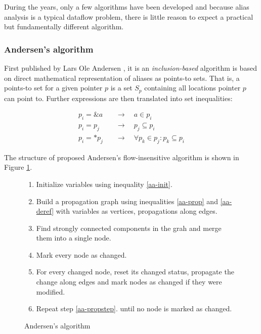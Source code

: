 During the years, only a few algorithms have been developed and because alias
analysis is a typical dataflow problem, there is little reason to expect a
practical but fundamentally different algorithm.

\subsubsection{Andersen's algorithm}

First published by Lars Ole Andersen \cite{Andersen94}, it is an {\it
inclusion-based} algorithm is based on direct mathematical representation of
aliases as points-to sets. That is, a points-to set for a given pointer $p$ is a
set $S_p$ containing all locations pointer $p$ can point to.  Further
expressions are then translated into set inequalities:

\begin{align}
	\label{aa-init}
	p_i = \&a \quad &\to \quad a \in p_i \\
	\label{aa-prop}
	p_i = p_j \quad &\to \quad p_j \subseteq p_i \\
	\label{aa-deref}
	p_i = *p_j \quad &\to \quad \forall p_k \in p_j : p_k \subseteq p_i
\end{align}

The structure of proposed Andersen's flow-insensitive algorithm is shown in Figure
\ref{figure-andersen}.

\begin{figure}[!ht]
\begin{tcolorbox}
\begin{enumerate}
	\item Initialize variables using inequality \ref{aa-init}.
	\item Build a propagation graph using inequalities \ref{aa-prop} and \ref{aa-deref}
		with variables as vertices, propagations along edges.
	\item Find strongly connected components in the grah and merge them into a single node.
	\item Mark every node as changed.
	\item For every changed node, reset its changed status, propagate the change
		along edges and mark nodes as changed if they were modified.
	\label{aa-propstep} 
	\item Repeat step \ref{aa-propstep}. until no node is marked as changed.
\end{enumerate}
\end{tcolorbox}
\caption{Andersen's algorithm}
\label{figure-andersen}
\end{figure}

